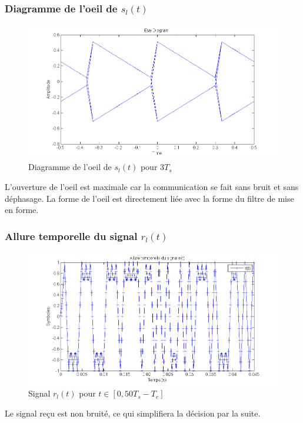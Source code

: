 \documentclass[11pt]{article}
\begin{document}
		\subsubsection{Diagramme de l'oeil de $s_l(t)$}
			\begin{figure}[h]
				\centering
				\includegraphics[scale=0.5]{images/Q318-2.png}
				\caption{Diagramme de l'oeil de $s_l(t)$ pour $3T_s$}
				\label{Q318-2}
			\end{figure}
			L'ouverture de l'oeil est maximale car la communication se fait sans bruit et sans déphasage. La forme de l'oeil est directement liée avec la forme du filtre de mise en forme.
		
		\subsubsection{Allure temporelle du signal $r_l(t)$}
			\begin{figure}[h]
				\centering
				\includegraphics[scale=0.5]{images/Q318-3.png}
				\caption{Signal $r_l(t)$ pour $t \in [0, 50T_s-T_e]$}
				\label{Q318-3}
			\end{figure}
			Le signal reçu est non bruité, ce qui simplifiera la décision par la suite.
		
\end{document}
